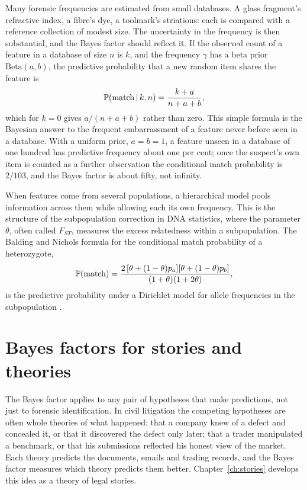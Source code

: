 Many forensic frequencies are estimated from small databases. A glass fragment's refractive index, a fibre's dye, a toolmark's striations: each is compared with a reference collection of modest size. The uncertainty in the frequency is then substantial, and the Bayes factor should reflect it. If the observed count of a feature in a database of size $n$ is $k$, and the frequency $\gamma$ has a beta prior $\text{Beta}(a,b)$, the predictive probability that a new random item shares the feature is
\begin{equation}
\mathbb{P}(\text{match}\,\vert\, k,n) = \frac{k + a}{n + a + b},
\label{eq:betapred}
\end{equation}
which for $k = 0$ gives $a/(n+a+b)$ rather than zero. This simple formula is the Bayesian answer to the frequent embarrassment of a feature never before seen in a database. With a uniform prior, $a = b = 1$, a feature unseen in a database of one hundred has predictive frequency about one per cent; once the suspect's own item is counted as a further observation the conditional match probability is $2/103$, and the Bayes factor is about fifty, not infinity.

When features come from several populations, a hierarchical model pools information across them while allowing each its own frequency. This is the structure of the subpopulation correction in DNA statistics, where the parameter $\theta$, often called $F_{ST}$, measures the excess relatedness within a subpopulation. The Balding and Nichols formula for the conditional match probability of a heterozygote,
\begin{equation}
\mathbb{P}(\text{match}) = \frac{2\,[\theta + (1-\theta)p_a][\theta + (1-\theta)p_b]}{(1+\theta)(1+2\theta)},
\end{equation}
is the predictive probability under a Dirichlet model for allele frequencies in the subpopulation \citep{balding2005}.

\section{Bayes factors for stories and theories}

The Bayes factor applies to any pair of hypotheses that make predictions, not just to forensic identification. In civil litigation the competing hypotheses are often whole theories of what happened: that a company knew of a defect and concealed it, or that it discovered the defect only later; that a trader manipulated a benchmark, or that his submissions reflected his honest view of the market. Each theory predicts the documents, emails and trading records, and the Bayes factor measures which theory predicts them better. Chapter~\ref{ch:stories} develops this idea as a theory of legal stories.


